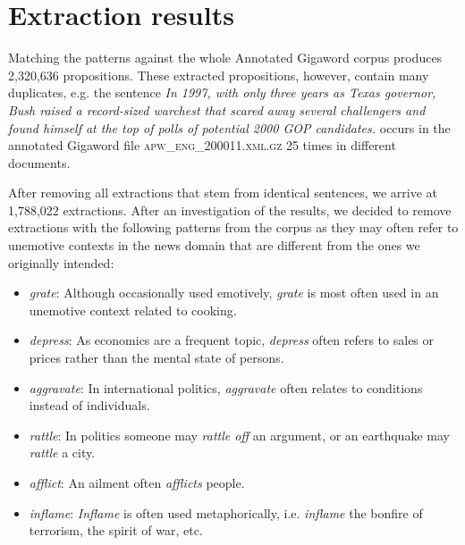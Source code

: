 \section{Extraction results} \label{sec:extraction_results}

Matching the patterns against the whole Annotated Gigaword corpus produces 2,320,636 propositions. These extracted propositions, however, contain many duplicates, e.g. the sentence \textit{In 1997, with only three years as Texas governor, Bush raised a record-sized warchest that scared away several challengers and found himself at the top of polls of potential 2000 GOP candidates.} occurs in the annotated Gigaword file \textsc{apw\_eng\_200011.xml.gz} 25 times in different documents.

After removing all extractions that stem from identical sentences, we arrive at 1,788,022 extractions. After an investigation of the results, we decided to remove extractions with the following patterns from the corpus as they may often refer to unemotive contexts in the news domain that are different from the ones we originally intended:

\begin{itemize}
	\item \textit{grate}: Although occasionally used emotively, \textit{grate} is most often used in an unemotive context related to cooking.
	\item \textit{depress}: As economics are a frequent topic, \textit{depress} often refers to sales or prices rather than the mental state of persons.
	\item \textit{aggravate}: In international politics, \textit{aggravate} often relates to conditions instead of individuals.
	\item \textit{rattle}: In politics someone may \textit{rattle off} an argument, or an earthquake may \textit{rattle} a city.
	\item \textit{afflict}: An ailment often \textit{afflicts} people.
	\item \textit{inflame}: \textit{Inflame} is often used metaphorically, i.e. \textit{inflame} the bonfire of terrorism, the spirit of war, etc.
\end{itemize}

